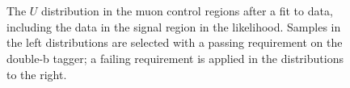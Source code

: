 \begin{figure}
  \\
  \\
\caption{The $U$ distribution in the muon control regions after a fit to data, including the data in the signal region in the likelihood. Samples in the left distributions are selected with a passing requirement on the double-b tagger; a failing requirement is applied in the distributions to the right.}
\label{Fig_cr_1}
\end{figure}

